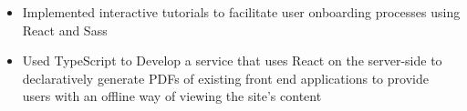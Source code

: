\documentclass[10pt,a4paper,roman]{moderncv}
\makeatletter
\newcommand*{\customcventry}[7][.15em]{
  \begin{tabular}{@{}l} 
    {\bfseries #4}
  \end{tabular}
  \hfill
  \begin{tabular}{l@{}}
     {\bfseries #5}
  \end{tabular} \\
  \begin{tabular}{@{}l} 
    {\itshape #3}
  \end{tabular}
  \hfill
  \begin{tabular}{l@{}}
     {\itshape #2}
  \end{tabular}
  \ifx&#7&%
  \else{\\%
    \begin{minipage}{\maincolumnwidth}%
      \small#7%
    \end{minipage}}\fi%
  \par\addvspace{#1}}
\makeatother
\begin{document}
{{{{{\begin{itemize}
\item Implemented interactive tutorials to facilitate user onboarding processes using React and Sass
\item Used TypeScript to Develop a service that uses React on the server-side to declaratively generate PDFs of existing front end
applications to provide users with an offline way of viewing the site’s content
\end{itemize}
}



}}}}
\end{document}
